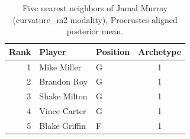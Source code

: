 \begin{table}[htbp]
  \centering\small
  \begin{tabular}{rllc}
    \toprule
    Rank & Player & Position & Archetype \\
    \midrule
    1 & Mike Miller & G & 1 \\
    2 & Brandon Roy & G & 1 \\
    3 & Shake Milton & G & 1 \\
    4 & Vince Carter & G & 1 \\
    5 & Blake Griffin & F & 1 \\
    \bottomrule
  \end{tabular}
  \caption{Five nearest neighbors of Jamal Murray (curvature_m2 modality), Procrustes-aligned posterior mean.}
  \label{tab:Jamal_Murray_neighbors_curvature_m2}
\end{table}

